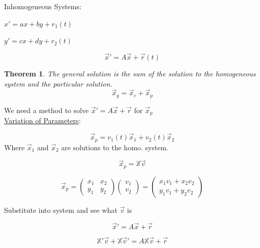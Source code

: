 \documentclass[12pt]{article}
\numberwithin{equation}{subsection}
\newtheorem{theorem}{Theorem}[section]
\newcommand{\indb}{\hspace{1cm}}
\newcommand{\indi}{\hspace{4.5cm}}
\begin{document}
\noindent Inhomogeneous Systems:

\indb $x'=ax+by+r_1(t)$

\indb $y'=cx+dy+r_2(t)$

\begin{equation}
\vec{x}'=A\vec{x}+\vec{r}(t)
\end{equation}


\begin{theorem}
The general solution is the sum of the solution to the homogeneous system and the particular solution.
\begin{equation}
\vec{x}_g = \vec{x}_c+ \vec{x}_p
\end{equation}
\end{theorem}
\newpage


We need a method to solve $\vec{x}'=A\vec{x}+\vec{r}$ for $\vec{x}_p$\\

\noindent \underline{Variation of Parameters}:

\begin{equation}
\vec{x}_p=v_1(t)\vec{x}_1+v_2(t)\vec{x}_2
\end{equation}
\indi Where $\vec{x}_1 $ and $\vec{x}_2$ are solutions to the homo. system.

\begin{equation}
\vec{x}_p=\mathbb{X}\vec{v}
\end{equation}

\begin{equation}
\vec{x}_p=\begin{pmatrix}
x_1 & x_2 \\
y_1 & y_2 
\end{pmatrix}\begin{pmatrix}
v_1\\
v_2
\end{pmatrix}=\begin{pmatrix}
x_1v_1 + x_2v_2 \\
y_1v_1 + y_2v_2
\end{pmatrix}
\end{equation}

Substitute into system and see what $\vec{v}$ is

\begin{equation}
\vec{x}'=A\vec{x}+\vec{r}
\end{equation}

\begin{equation}
\mathbb{X}'\vec{v} + \mathbb{X}\vec{v}' =A\mathbb{X}\vec{v}+\vec{r}
\end{equation}
\end{document}
